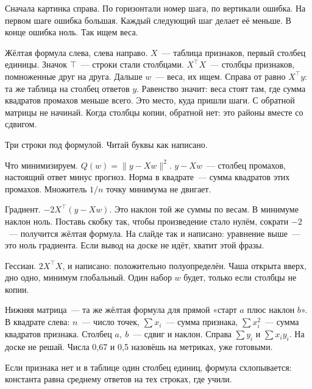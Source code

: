 \documentclass[11pt,a4paper]{article}
\newcommand{\say}[1]{\begin{saybox}#1\end{saybox}}
\begin{document}
\say{Сначала картинка справа. По горизонтали номер шага, по вертикали ошибка. На первом шаге ошибка большая. Каждый следующий шаг делает её меньше. В конце ошибка ноль. Так ищем веса.

Жёлтая формула слева, слева направо. \(X\)~--- таблица признаков, первый столбец единицы. Значок \(\top\)~--- строки стали столбцами. \(X^{\top}X\)~--- столбцы признаков, помноженные друг на друга. Дальше \(w\)~--- веса, их ищем. Справа от равно \(X^{\top}y\): та же таблица на столбец ответов \(y\). Равенство значит: веса стоят там, где сумма квадратов промахов меньше всего. Это место, куда пришли шаги. С обратной матрицы не начинай. Когда столбцы копии, обратной нет: это районы вместе со сдвигом.

Три строки под формулой. Читай буквы как написано.

Что минимизируем. \(Q(w)=\|y-Xw\|^{2}\). \(y-Xw\)~--- столбец промахов, настоящий ответ минус прогноз. Норма в квадрате~--- сумма квадратов этих промахов. Множитель \(1/n\) точку минимума не двигает.

Градиент. \(-2X^{\top}(y-Xw)\). Это наклон той же суммы по весам. В минимуме наклон ноль. Поставь скобку так, чтобы произведение стало нулём, сократи \(-2\)~--- получится жёлтая формула. На слайде так и написано: уравнение выше~--- это ноль градиента. Если вывод на доске не идёт, хватит этой фразы.

Гессиан. \(2X^{\top}X\), и написано: положительно полуопределён. Чаша открыта вверх, дно одно, минимум глобальный. Один набор \(w\) будет, только если столбцы не копии.

Нижняя матрица~--- та же жёлтая формула для прямой «старт \(a\) плюс наклон \(b\)». В квадрате слева: \(n\)~--- число точек, \(\sum x_i\)~--- сумма признака, \(\sum x_i^{2}\)~--- сумма квадратов признака. Столбец \(a,\ b\)~--- сдвиг и наклон. Справа \(\sum y_i\) и \(\sum x_i y_i\). На доске не решай. Числа 0,67 и 0,5 назовёшь на метриках, уже готовыми.

Если признака нет и в таблице один столбец единиц, формула схлопывается: константа равна среднему ответов на тех строках, где учили.}
\end{document}
